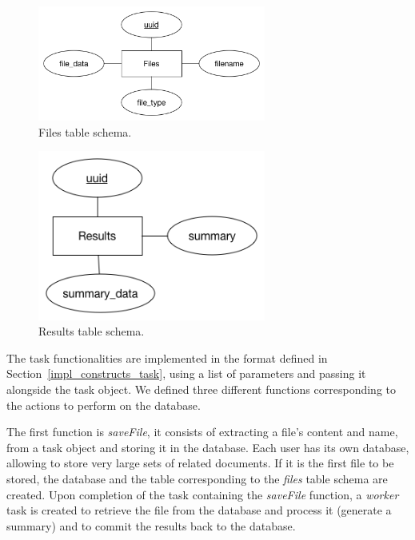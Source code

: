 \documentclass[12pt, titlepage]{uo_temp}
\begin{document}
     \begin{figure}[h!]
       \centering
       \includegraphics[width=75mm]{images/mdts_files_db_schema.png}
       \caption{Files table schema.}\label{files_scm}
     \end{figure}

     \begin{figure}[h!]
       \centering
       \includegraphics[width=75mm]{images/mdts_results_db_schema.png}
       \caption{Results table schema.}\label{results_scm}
     \end{figure}

     The task functionalities are implemented in the format defined in
     Section~\ref{impl_constructs_task}, using a list of parameters and passing it
     alongside the task object. We defined three different functions corresponding to the
     actions to perform on the database.

     The first function is \emph{saveFile}, it consists of extracting a file's content and
     name, from a task object and storing it in the database. Each user has its own
     database, allowing to store very large sets of related documents. If it is the first
     file to be stored, the database and the table corresponding to the \emph{files} table
     schema are created. Upon completion of the task containing the \emph{saveFile}
     function, a \emph{worker} task is created to retrieve the file from the database and
     process it (generate a summary) and to commit the results back to the database.
\end{document}

